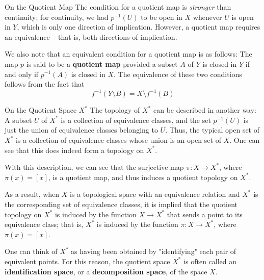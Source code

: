 \begin{remarkBox}{On the Quotient Map}
    The condition for a quotient map is \textit{stronger} than continuity; for 
    continuity, we had \( p^{ -1 } ( U ) \) to be open in \( X \) whenever 
    \( U \) is open in \( Y \), which is only one direction of implication.
    However, a quotient map requires an equivalence -- that is, both directions
    of implication.

    \baseRule

    We also note that an equivalent condition for a quotient map is as follows:
    The map \( p \) is said to be a \textbf{quotient map} provided a subset
    \( A \) of \( Y \) is closed in \( Y \) if and only if \( p^{ -1 } ( A ) \)
    is closed in \( X \).
    The equivalence of these two conditions follows from the fact that 
    \begin{equation*}
        f^{ -1 } ( Y \setminus B ) = X \setminus f^{ -1 } ( B )
    \end{equation*}
\end{remarkBox}

\begin{remarkBox}{On the Quotient Space \( X^{ * } \)}
    The topology of \( X^{ * } \) can be described in another way: 
    A subset \( U \) of \( X^{ * } \) is a collection of equivalence classes,
    and the set \( p^{ -1 } ( U ) \) is just the union of equivalence classes
    belonging to \( U \).
    Thus, the typical open set of \( X^{ * } \) is a collection of equivalence
    classes whose union is an open set of \( X \).
    One can see that this does indeed form a topology on \( X^{ * } \).

    \baseSkip

    With this description, we can see that the surjective map 
    \( \pi: X \rightarrow X^{ * } \), where \( \pi ( x ) = [ x ] \), is 
    a quotient map, and thus induces a quotient topology on \( X^{ * } \).

    \baseSkip 

    As a result, when \( X \) is a topological space with an equivalence 
    relation and \( X^{ * } \) is the corresponding set of equivalence classes, 
    it is implied that the quotient topology on \( X^{ * } \) is induced by the 
    function \( X \rightarrow X^{ * } \) that sends a point to its equivalence 
    class;
    that is, \( X^{ * } \) is induced by the function \( \pi: X \rightarrow 
    X^{ * } \), where \( \pi ( x ) = [ x ] \).

    \baseRule

    One can think of \( X^{ * } \) as having been obtained by "identifying"
    each pair of equivalent points. 
    For this reason, the quotient space \( X^{ * } \) is often called an
    \textbf{identification space}, or a \textbf{decomposition space}, of 
    the space \( X \).
\end{remarkBox}

